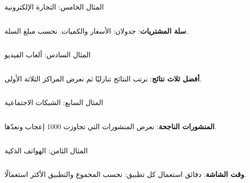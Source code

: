 \begin{frame}[t]{المثال الخامس: التجارة الإلكترونية}
    \begin{columns}[T]
        {\small\textbf{سلة المشتريات}: جدولان: الأسعار والكميات. نحسب مبلغ السلة.\par}
        \vspace{0.3cm}
    \end{columns}
\end{frame}

\begin{frame}[t]{المثال السادس: ألعاب الفيديو}
    \begin{columns}[T]
        {\small\textbf{أفضل ثلاث نتائج}: نرتب النتائج تنازليًا ثم نعرض المراكز الثلاثة الأولى.\par}
        \vspace{0.3cm}
    \end{columns}
\end{frame}

\begin{frame}[t]{المثال السابع: الشبكات الاجتماعية}
    \begin{columns}[T]
        {\small\textbf{المنشورات الناجحة}: نعرض المنشورات التي تجاوزت 1000 إعجاب ونعدّها.\par}
        \vspace{0.3cm}
    \end{columns}
\end{frame}

\begin{frame}[t]{المثال الثامن: الهواتف الذكية}
    \begin{columns}[T]
        {\small\textbf{وقت الشاشة}: دقائق استعمال كل تطبيق: نحسب المجموع والتطبيق الأكثر استعمالًا.\par}
        \vspace{0.3cm}
    \end{columns}
\end{frame}

